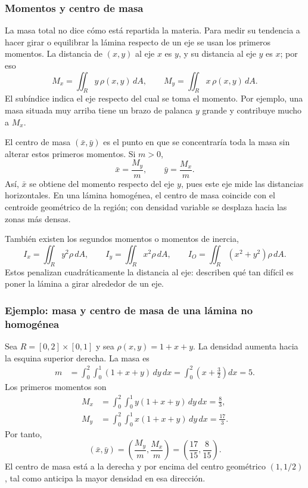 \subsubsection*{Momentos y centro de masa}

La masa total no dice cómo está repartida la materia. Para medir su tendencia a hacer girar o equilibrar la lámina respecto de un eje se usan los primeros momentos. La distancia de $(x,y)$ al eje $x$ es $y$, y su distancia al eje $y$ es $x$; por eso
\[
M_x=\iint_R y\,\rho(x,y)\,dA,
\qquad
M_y=\iint_R x\,\rho(x,y)\,dA.
\]
El subíndice indica el eje respecto del cual se toma el momento. Por ejemplo, una masa situada muy arriba tiene un brazo de palanca $y$ grande y contribuye mucho a $M_x$.

El centro de masa $(\bar x,\bar y)$ es el punto en que se concentraría toda la masa sin alterar estos primeros momentos. Si $m>0$,
\[
\bar x=\frac{M_y}{m},
\qquad
\bar y=\frac{M_x}{m}.
\]
Así, $\bar x$ se obtiene del momento respecto del eje $y$, pues este eje mide las distancias horizontales. En una lámina homogénea, el centro de masa coincide con el centroide geométrico de la región; con densidad variable se desplaza hacia las zonas más densas.

También existen los segundos momentos o momentos de inercia,
\[
I_x=\iint_R y^2\rho\,dA,
\qquad
I_y=\iint_R x^2\rho\,dA,
\qquad
I_O=\iint_R(x^2+y^2)\rho\,dA.
\]
Estos penalizan cuadráticamente la distancia al eje: describen qué tan difícil es poner la lámina a girar alrededor de un eje.

\subsubsection*{Ejemplo: masa y centro de masa de una lámina no homogénea}

Sea $R=[0,2]\times[0,1]$ y sea $\rho(x,y)=1+x+y$. La densidad aumenta hacia la esquina superior derecha. La masa es
\begin{align*}
m&=\int_0^2\int_0^1(1+x+y)\,dy\,dx
=\int_0^2\left(x+\frac32\right)dx=5.
\end{align*}
Los primeros momentos son
\begin{align*}
M_x&=\int_0^2\int_0^1y(1+x+y)\,dy\,dx=\frac83,\\
M_y&=\int_0^2\int_0^1x(1+x+y)\,dy\,dx=\frac{17}{3}.
\end{align*}
Por tanto,
\[
(\bar x,\bar y)=\left(\frac{M_y}{m},\frac{M_x}{m}\right)
=\left(\frac{17}{15},\frac{8}{15}\right).
\]
El centro de masa está a la derecha y por encima del centro geométrico $(1,1/2)$, tal como anticipa la mayor densidad en esa dirección.

